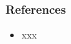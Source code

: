 \begin{frame}\frametitle{References}
\footnotesize
\begin{itemize}
\item xxx
\end{itemize}
\end{frame}
